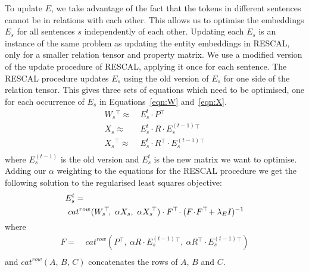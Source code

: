 \documentclass[11pt,a4paper]{article}
\newcommand{\trans}{{}^{\top}}
\begin{document}
To update $E$, we take advantage of the fact that the tokens in different
sentences cannot be in relations with each other.  This allows us to optimise
the embeddings $E_s$ for all sentences $s$ independently of each other.
Updating each $E_s$ is an instance of the same problem as updating the entity
embeddings in RESCAL, only for a smaller relation tensor and property matrix.
We use a modified version of the update procedure of RESCAL, applying it once
for each 
sentence.  The RESCAL procedure updates $E_s$ using the old version of $E_s$
for one side of the relation tensor.  This gives three sets of equations which
need to be optimised, one for each occurrence of $E_s$ in Equations~\ref{eqn:W}
and~\ref{eqn:X}.
\vspace{-0.5ex}
\begin{align}
\nonumber
W_s\!\trans \approx~& E^{t}_s \cdot P\trans 
\\ \nonumber
X_s \approx~& E^{t}_s \cdot R \cdot E^{(t-1)}_s\!\trans 
\\ \nonumber
X_s\!\trans \approx~& E^{t}_s \cdot R\trans\! \cdot E^{(t-1)}_s\!\trans 
\\[-4ex]\nonumber
\end{align}
where $E^{(t-1)}_s$ is the old version and $E^{t}_s$ is the new matrix we want
to optimise.  Adding our $\alpha$ weighting to the equations for the RESCAL
procedure we get the following solution to the regularised least squares
objective:
\vspace{-0.5ex}
\begin{align}
  &
  E^{t}_s =
  \label{eqn:updateE}
  \\&
  ~ cat^{row}(W_s\!\trans\!,~ \alpha X_s,~ \alpha X_s\!\trans)
  \cdot F\trans\! \cdot (F \!\cdot\! F\trans\! + \lambda_E I\/)^{-1}
  \nonumber
\\[-4ex]\nonumber
\end{align}
where
\vspace{-0.5ex}
\begin{align*}
F =~& cat^{row}(P\trans\!,~ \alpha R \cdot E^{(t-1)}_s\!\trans\!,~ \alpha R\trans \cdot E^{(t-1)}_s\!\trans)
\\[-4ex]\nonumber
\end{align*}
and $cat^{row}(A,\,B,\,C)$ concatenates the rows of $A$, $B$ and $C$.
\end{document}
